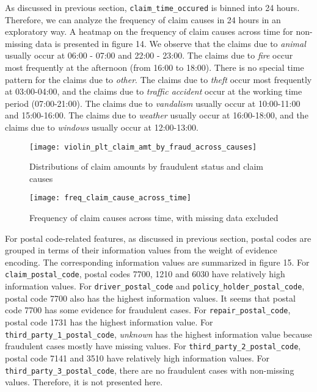 \documentclass[12pt]{article}
\begin{document}
As discussed in previous section, \texttt{claim\_time\_occured} is binned into 24 hours. Therefore, we can analyze the frequency of claim causes in 24 hours in an exploratory way. A heatmap on the frequency of claim causes across time for non-missing data is presented in figure 14. We observe that the claims due to \textit{animal} usually occur at 06:00 - 07:00 and 22:00 - 23:00. The claims due to \textit{fire} occur most frequently at the afternoon (from 16:00 to 18:00). There is no special time pattern for the claims due to \textit{other}. The claims due to \textit{theft} occur most frequently at 03:00-04:00, and the claims due to \textit{traffic accident} occur at the working time period (07:00-21:00). The claims due to \textit{vandalism} usually occur at 10:00-11:00 and 15:00-16:00. The claims due to \textit{weather} usually occur at 16:00-18:00, and the claims due to \textit{windows} usually occur at 12:00-13:00.

\begin{figure}[h]
\centering
\texttt{[image: violin\_plt\_claim\_amt\_by\_fraud\_across\_causes]}
\caption{Distributions of claim amounts by fraudulent status and claim causes}
\end{figure}

\begin{figure}[h]
\centering
\texttt{[image: freq\_claim\_cause\_across\_time]}
\caption{Frequency of claim causes across time, with missing data excluded}
\end{figure}

\vspace{-0.5cm}
For postal code-related features, as discussed in previous section, postal codes are grouped in terms of their information values from the weight of evidence encoding. The corresponding information values are summarized in figure 15. For \texttt{claim\_postal\_code}, postal codes 7700, 1210 and 6030 have relatively high information values. For \texttt{driver\_postal\_code} and \texttt{policy\_holder\_postal\_code}, postal code 7700 also has the highest information values. It seems that postal code 7700 has some evidence for fraudulent cases. For \texttt{repair\_postal\_code}, postal code 1731 has the highest information value. For \texttt{third\_party\_1\_postal\_code}, \textit{unknown} has the highest information value because fraudulent cases mostly have missing values. For \texttt{third\_party\_2\_postal\_code}, postal code 7141 and 3510 have relatively high information values. For \texttt{third\_party\_3\_postal\_code}, there are no fraudulent cases with non-missing values. Therefore, it is not presented here. 
\end{document}
